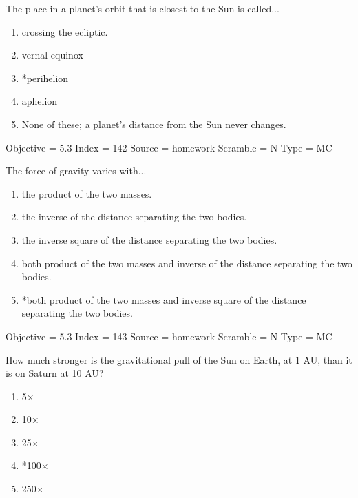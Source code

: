 \documentclass[11pt]{article}
\begin{document}
\begin{enumerate}
\begin{minipage}{\textwidth}
\begin{minipage}{\textwidth}
\item The place in a planet's orbit that is closest to the Sun is called...
\begin{enumerate} 
\setlength{\itemsep}{1pt} 
\setlength{\parskip}{0pt} 
\setlength{\parsep}{0pt}
\setlength{\multicolsep}{1pt} 
\item crossing the ecliptic.
\item vernal equinox
\item *perihelion
\item aphelion
\item None of these; a planet's distance from the Sun never changes.
\end{enumerate} 
Objective = 5.3
Index = 142
Source = homework
Scramble = N
Type = MC
\end{minipage}
\end{minipage}
\vskip 0.20in

\begin{minipage}{\textwidth}
\begin{minipage}{\textwidth}
\item The force of gravity varies with...
\begin{enumerate} 
\setlength{\itemsep}{1pt} 
\setlength{\parskip}{0pt} 
\setlength{\parsep}{0pt}
\setlength{\multicolsep}{1pt} 
\item the product of the two masses.
\item the inverse of the distance separating the two bodies.
\item the inverse square of the distance separating the two bodies.
\item both product of the two masses and inverse of the distance separating the two bodies.
\item *both product of the two masses and inverse square of the distance separating the two bodies.
\end{enumerate} 
Objective = 5.3
Index = 143
Source = homework
Scramble = N
Type = MC
\end{minipage}
\end{minipage}
\vskip 0.20in

\begin{minipage}{\textwidth}
\begin{minipage}{\textwidth}
\item How much stronger is the gravitational pull of the Sun on Earth, at 1 AU, than it is on Saturn at 10 AU?
\begin{multicols}{3}
\begin{enumerate} 
\setlength{\itemsep}{1pt} 
\setlength{\parskip}{0pt} 
\setlength{\parsep}{0pt}
\setlength{\multicolsep}{1pt} 
\item 5×
\item 10×
\item 25×
\item *100×
\item 250×
\end{enumerate} 
\vfill 
\end{multicols}


\end{minipage}
\end{minipage}
\end{enumerate}
\end{document}
